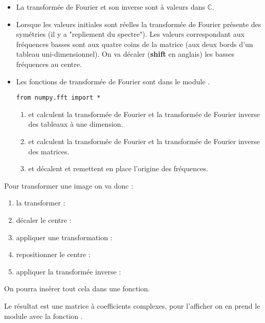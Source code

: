\begin{itemize}
\item La transformée de Fourier et son inverse sont à valeurs dans $\mathbb C$.
\item Lorsque les valeurs initiales sont réelles la transformée de Fourier présente des symétries (il y a "repliement du spectre"). Les valeurs correspondant aux fréquences basses sont aux quatre coins de la matrice (aux deux bords d'un tableau uni-dimensionnel). On va décaler ({\bf shift} en anglais) les basses fréquences au centre.

\item Les fonctions de transformée de Fourier sont dans le module .
\begin{lstlisting}
from numpy.fft import *
\end{lstlisting}
\begin{enumerate}
\item {} et  calculent la transformée de Fourier et la transformée de Fourier inverse des tableaux à une dimension.

\item {} et  calculent la transformée de Fourier et la transformée de Fourier inverse des matrices.

\item {} et  décalent et remettent en place l'origine des fréquences.
\end{enumerate}
\end{itemize}

Pour transformer une image on va donc :

\begin{enumerate}
\item la transformer : 
\item décaler le centre : 
\item appliquer une transformation : 
\item repositionner le centre : 
\item appliquer la transformée inverse : 
\end{enumerate}

On pourra insérer tout cela dans une fonction.

Le résultat est une matrice à coefficients complexes, pour l'afficher on en prend le module avec la fonction .

\medskip

